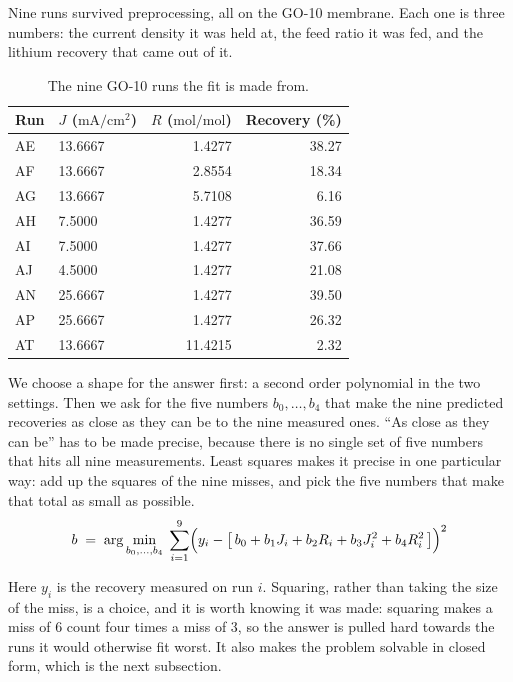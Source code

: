 Nine runs survived preprocessing, all on the GO-10 membrane. Each one is three numbers: the
current density it was held at, the feed ratio it was fed, and the lithium recovery that came
out of it.

\begin{table}[htbp]
  \centering
  \caption{The nine GO-10 runs the fit is made from.}
  \label{tab:nine-runs}
  \begin{tabular}{llrr}
    \toprule
    Run & $J$ ($\mathrm{mA/cm^2}$) & $R$ ($\mathrm{mol/mol}$) & Recovery (\%) \\
    \midrule
    AE & 13.6667 & 1.4277  & 38.27 \\
    AF & 13.6667 & 2.8554  & 18.34 \\
    AG & 13.6667 & 5.7108  & 6.16  \\
    AH & 7.5000  & 1.4277  & 36.59 \\
    AI & 7.5000  & 1.4277  & 37.66 \\
    AJ & 4.5000  & 1.4277  & 21.08 \\
    AN & 25.6667 & 1.4277  & 39.50 \\
    AP & 25.6667 & 1.4277  & 26.32 \\
    AT & 13.6667 & 11.4215 & 2.32  \\
    \bottomrule
  \end{tabular}
\end{table}

We choose a shape for the answer first: a second order polynomial in the two settings. Then
we ask for the five numbers $b_0,\dots,b_4$ that make the nine predicted recoveries as close
as they can be to the nine measured ones. ``As close as they can be'' has to be made precise,
because there is no single set of five numbers that hits all nine measurements. Least squares
makes it precise in one particular way: add up the squares of the nine misses, and pick the
five numbers that make that total as small as possible.
%
\begin{equation}
  b \;=\; \arg\min_{b_0,\dots,b_4} \;\sum_{i=1}^{9}
  \Bigl( y_i - \bigl[\, b_0 + b_1 J_i + b_2 R_i + b_3 J_i^{2} + b_4 R_i^{2} \,\bigr] \Bigr)^{2}
  \label{eq:least-squares-question}
\end{equation}

Here $y_i$ is the recovery measured on run $i$. Squaring, rather than taking the size of the
miss, is a choice, and it is worth knowing it was made: squaring makes a miss of $6$ count
four times a miss of $3$, so the answer is pulled hard towards the runs it would otherwise
fit worst. It also makes the problem solvable in closed form, which is the next subsection.

